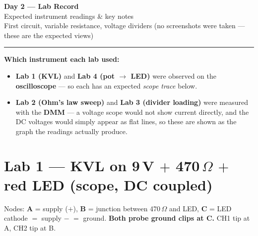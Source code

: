 \documentclass[11pt,a4paper]{article}
\begin{document}
\begin{center}
{\LARGE\bfseries Day 2 --- Lab Record}\\[2pt]
{\large Expected instrument readings \& key notes}\\[4pt]
{\small First circuit, variable resistance, voltage dividers \quad(no screenshots were taken --- these are the expected views)}
\end{center}

\hrule
\vspace{6pt}

\textbf{Which instrument each lab used:}
\begin{itemize}
  \item \textbf{Lab 1 (KVL)} and \textbf{Lab 4 (pot $\to$ LED)} were observed on the \textbf{oscilloscope} --- so each has an expected \emph{scope trace} below.
  \item \textbf{Lab 2 (Ohm's law sweep)} and \textbf{Lab 3 (divider loading)} were measured with the \textbf{DMM} --- a voltage scope would not show current directly, and the DC voltages would simply appear as flat lines, so these are shown as the graph the readings actually produce.
\end{itemize}

\section*{Lab 1 --- KVL on 9\,V $+$ 470\,$\Omega$ $+$ red LED \hfill\normalfont\small (scope, DC coupled)}

Nodes: \textbf{A} = supply ($+$), \textbf{B} = junction between 470\,$\Omega$ and LED, \textbf{C} = LED cathode $=$ supply $-$ $=$ ground.
\textbf{Both probe ground clips at C.} CH1 tip at A, CH2 tip at B.

\begin{center}
\end{center}
\end{document}
